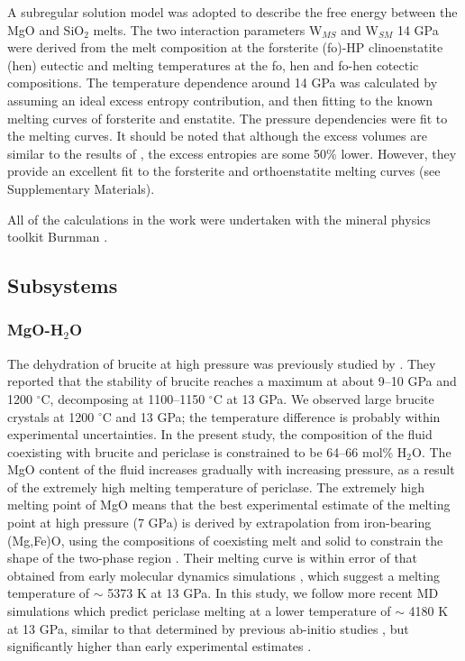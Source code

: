 \documentclass[review]{elsarticle}
\begin{document}
A subregular solution model was adopted to describe the free energy between the MgO and SiO$_2$ melts. The two interaction parameters W$_{MS}$ and W$_{SM}$ 14 GPa were derived from the melt composition at the forsterite (fo)-HP clinoenstatite (hen) eutectic \citep{} and melting temperatures at the fo, hen and fo-hen cotectic compositions. The temperature dependence around 14 GPa was calculated by assuming an ideal excess entropy contribution, and then fitting to the known melting curves of forsterite and enstatite. The pressure dependencies were fit to the melting curves. It should be noted that although the excess volumes are similar to the results of \cite{DKS2013}, the excess entropies are some 50\% lower. However, they provide an excellent fit to the forsterite and orthoenstatite melting curves (see Supplementary Materials).

All of the calculations in the work were undertaken with the mineral physics toolkit Burnman \cite{}.



\citep{NM2008}
\citep{DM2010}
\citep{ZK1998}

\subsection{Subsystems}
\subsubsection{MgO-H$_2$O}
The dehydration of brucite at high pressure was previously studied by \cite{FIYKFO2005}. They reported that the stability of brucite reaches a maximum at about 9--10 GPa and 1200 $^{\circ}$C, decomposing at 1100--1150 $^{\circ}$C at 13 GPa. We observed large brucite crystals at 1200 $^{\circ}$C and 13 GPa; the temperature difference is probably within experimental uncertainties. In the present study, the composition of the fluid coexisting with brucite and periclase is constrained to be 64--66 mol\% H$_2$O. The MgO content of the fluid increases gradually with increasing pressure, as a result of the extremely high melting temperature of periclase. The extremely high melting point of MgO means that the best experimental estimate of the melting point at high pressure (7 GPa) is derived by extrapolation from iron-bearing (Mg,Fe)O, using the compositions of coexisting melt and solid to constrain the shape of the two-phase region \citep{ZF2008}. Their melting curve is within error of that obtained from early molecular dynamics simulations \citep{CG1994}, which suggest a melting temperature of $\sim$ 5373 K at 13 GPa. In this study, we follow more recent MD simulations \citep{KKS2013, DKS2013} which predict periclase melting at a lower temperature of $\sim$ 4180 K at 13 GPa, similar to that determined by previous ab-initio studies \citep{Alfe2005}, but significantly higher than early experimental estimates \citep[$\sim$ 3100 K][]{ZB1994}. 
\end{document}
